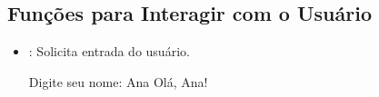 \documentclass[letterpaper,10pt,english]{jupyterBook}
\begin{document}
\subsection{Funções para Interagir com o Usuário}
\label{\detokenize{chapters/ch5/ch5:funcoes-para-interagir-com-o-usuario}}\begin{itemize}
\item {} 
\sphinxAtStartPar
{}: Solicita entrada do usuário.

\begin{sphinxVerbatim}[commandchars=\\\{\}]
  
\end{sphinxVerbatim}

\begin{sphinxVerbatim}[commandchars=\\\{\}]
Digite seu nome: Ana
Olá, Ana!
\end{sphinxVerbatim}

\end{itemize}
\end{document}
